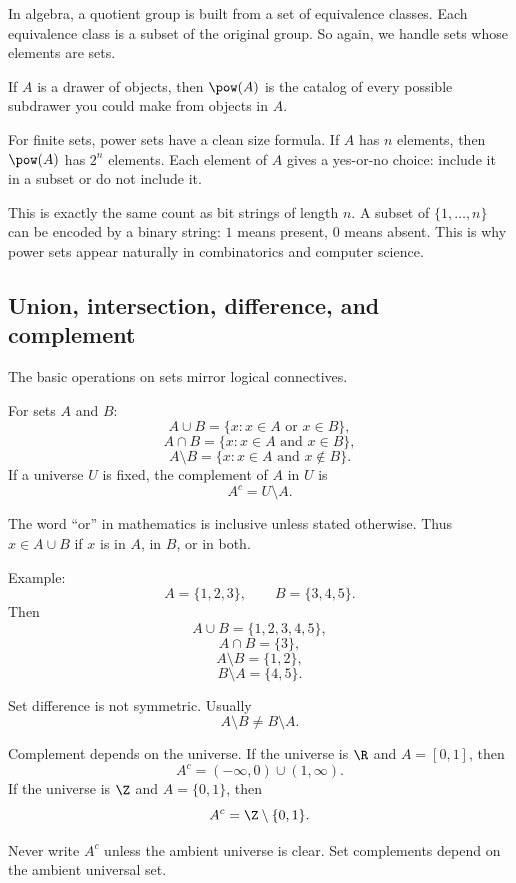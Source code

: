 In algebra, a quotient group is built from a set of equivalence classes. Each equivalence class is a subset of the original group. So again, we handle sets whose elements are sets.

\begin{intuitionbox}
If $A$ is a drawer of objects, then $\pow(A)$ is the catalog of every possible subdrawer you could make from objects in $A$.
\end{intuitionbox}

For finite sets, power sets have a clean size formula. If $A$ has $n$ elements, then $\pow(A)$ has $2^n$ elements. Each element of $A$ gives a yes-or-no choice: include it in a subset or do not include it.

This is exactly the same count as bit strings of length $n$. A subset of $\{1,\ldots,n\}$ can be encoded by a binary string: $1$ means present, $0$ means absent. This is why power sets appear naturally in combinatorics and computer science.

\subsection{Union, intersection, difference, and complement}

The basic operations on sets mirror logical connectives.

\begin{formalbox}
For sets $A$ and $B$:
\[
A\cup B=\{x:x\in A\text{ or }x\in B\},
\]
\[
A\cap B=\{x:x\in A\text{ and }x\in B\},
\]
\[
A\setminus B=\{x:x\in A\text{ and }x\notin B\}.
\]
If a universe $U$ is fixed, the complement of $A$ in $U$ is
\[
A^c=U\setminus A.
\]
\end{formalbox}

The word ``or'' in mathematics is inclusive unless stated otherwise. Thus $x\in A\cup B$ if $x$ is in $A$, in $B$, or in both.

Example:
\[
A=\{1,2,3\},\qquad B=\{3,4,5\}.
\]
Then
\[
A\cup B=\{1,2,3,4,5\},
\]
\[
A\cap B=\{3\},
\]
\[
A\setminus B=\{1,2\},
\]
\[
B\setminus A=\{4,5\}.
\]

Set difference is not symmetric. Usually
\[
A\setminus B\neq B\setminus A.
\]

Complement depends on the universe. If the universe is $\R$ and $A=[0,1]$, then
\[
A^c=(-\infty,0)\cup(1,\infty).
\]
If the universe is $\Z$ and $A=\{0,1\}$, then
\[
A^c=\Z\setminus\{0,1\}.
\]

\begin{trapbox}
Never write $A^c$ unless the ambient universe is clear. Set complements depend on the ambient universal set.
\end{trapbox}

